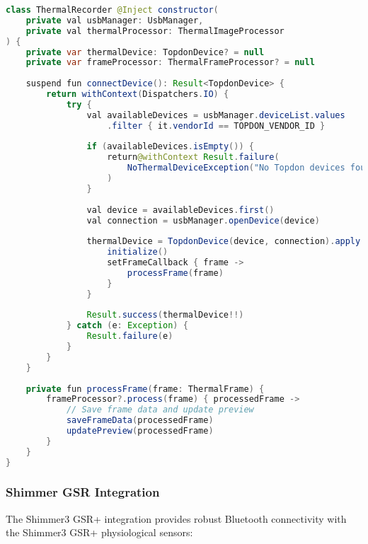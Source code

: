 \documentclass[11pt,a4paper]{report}
\begin{document}
\begin{lstlisting}[language=Java]
class ThermalRecorder @Inject constructor(
    private val usbManager: UsbManager,
    private val thermalProcessor: ThermalImageProcessor
) {
    private var thermalDevice: TopdonDevice? = null
    private var frameProcessor: ThermalFrameProcessor? = null
    
    suspend fun connectDevice(): Result<TopdonDevice> {
        return withContext(Dispatchers.IO) {
            try {
                val availableDevices = usbManager.deviceList.values
                    .filter { it.vendorId == TOPDON_VENDOR_ID }
                
                if (availableDevices.isEmpty()) {
                    return@withContext Result.failure(
                        NoThermalDeviceException("No Topdon devices found")
                    )
                }
                
                val device = availableDevices.first()
                val connection = usbManager.openDevice(device)
                
                thermalDevice = TopdonDevice(device, connection).apply {
                    initialize()
                    setFrameCallback { frame ->
                        processFrame(frame)
                    }
                }
                
                Result.success(thermalDevice!!)
            } catch (e: Exception) {
                Result.failure(e)
            }
        }
    }
    
    private fun processFrame(frame: ThermalFrame) {
        frameProcessor?.process(frame) { processedFrame ->
            // Save frame data and update preview
            saveFrameData(processedFrame)
            updatePreview(processedFrame)
        }
    }
}
\end{lstlisting}

\subsubsection{Shimmer GSR Integration}

The Shimmer3 GSR+ integration provides robust Bluetooth connectivity with the Shimmer3 GSR+ physiological sensors:
\end{document}
